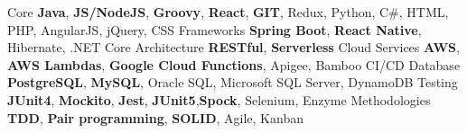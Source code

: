%
%
%

	\begin{scholarship}
		\keywordsentry
			{Core}
			{\textbf{Java}, \textbf{JS/NodeJS}, \textbf{Groovy}, \textbf{React}, \textbf{GIT}, Redux, Python, C\#, HTML, PHP, AngularJS, jQuery, CSS}
		\keywordsentry
			{Frameworks}
			{\textbf{Spring Boot}, \textbf{React Native}, Hibernate, .NET Core}
		\keywordsentry
			{Architecture}
			{\textbf{RESTful}, \textbf{Serverless}}
		\keywordsentry
			{Cloud Services}
			{\textbf{AWS}, \textbf{AWS Lambdas}, \textbf{Google Cloud Functions}, Apigee, Bamboo CI/CD}
		\keywordsentry
			{Database}
			{\textbf{PostgreSQL}, \textbf{MySQL}, Oracle SQL, Microsoft SQL Server, DynamoDB}
		\keywordsentry
			{Testing}
			{\textbf{JUnit4}, \textbf{Mockito}, \textbf{Jest}, \textbf{JUnit5},\textbf{Spock}, Selenium, Enzyme}
		\keywordsentry
			{Methodologies}
			{\textbf{TDD}, \textbf{Pair programming}, \textbf{SOLID}, Agile, Kanban}
	\end{scholarship}